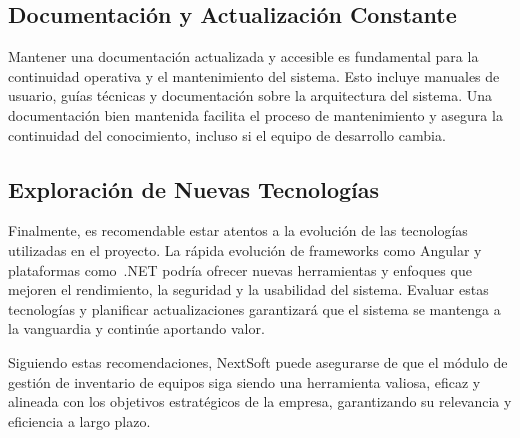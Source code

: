 \documentclass[stu, 12pt, letterpaper, donotrepeattitle, floatsintext, natbib]{apa7}
\begin{document}
\subsection{Documentación y Actualización Constante}
Mantener una documentación actualizada y accesible es fundamental para la continuidad operativa y el mantenimiento del sistema. Esto incluye
manuales de usuario, guías técnicas y documentación sobre la arquitectura del sistema. Una documentación bien mantenida facilita el proceso
de mantenimiento y asegura la continuidad del conocimiento, incluso si el equipo de desarrollo cambia.
\subsection{Exploración de Nuevas Tecnologías}
Finalmente, es recomendable estar atentos a la evolución de las tecnologías utilizadas en el proyecto. La rápida evolución de frameworks como
Angular y plataformas como~.NET podría ofrecer nuevas herramientas y enfoques que mejoren el rendimiento, la seguridad y la usabilidad del
sistema. Evaluar estas tecnologías y planificar actualizaciones garantizará que el sistema se mantenga a la vanguardia y continúe aportando
valor.
\newline

Siguiendo estas recomendaciones, NextSoft puede asegurarse de que el módulo de gestión de inventario de equipos siga siendo una herramienta
valiosa, eficaz y alineada con los objetivos estratégicos de la empresa, garantizando su relevancia y eficiencia a largo plazo.
\newpage

\nocite{*}
\end{document}
